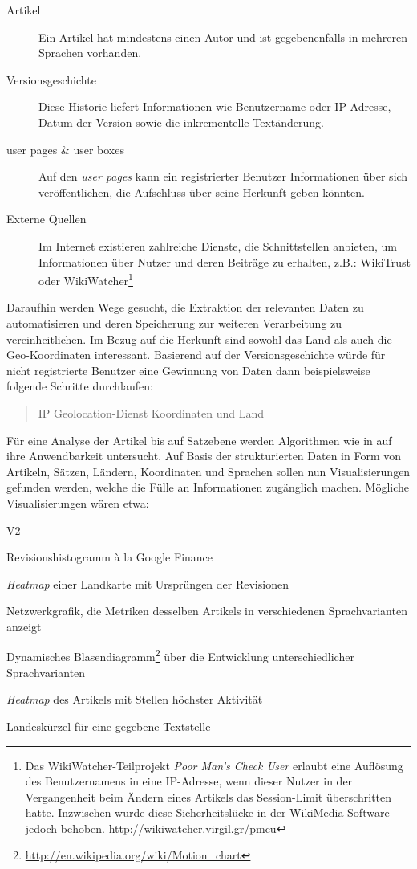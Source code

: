 \begin{description}
\item[Artikel] Ein Artikel hat mindestens einen Autor und ist gegebenenfalls in mehreren Sprachen vorhanden.
\item[Versionsgeschichte] Diese Historie liefert Informationen wie Benutzername oder IP-Adresse, Datum der Version sowie die inkrementelle Textänderung.
\item[user pages \& user boxes] Auf den \emph{user pages} kann ein registrierter Benutzer Informationen über sich veröffentlichen, die Aufschluss über seine Herkunft geben könnten.
\item[Externe Quellen] Im Internet existieren zahlreiche Dienste, die Schnittstellen anbieten, um Informationen über Nutzer und deren Beiträge zu erhalten, z.B.: WikiTrust oder WikiWatcher\footnote{Das WikiWatcher-Teilprojekt \emph{Poor Man's Check User} erlaubt eine Auflösung des Benutzernamens in eine IP-Adresse, wenn dieser Nutzer in der Vergangenheit beim Ändern eines Artikels das Session-Limit überschritten hatte. Inzwischen wurde diese Sicherheitslücke in der WikiMedia-Software jedoch behoben. \url{http://wikiwatcher.virgil.gr/pmcu}}
\end{description}

Daraufhin werden Wege gesucht, die Extraktion der relevanten Daten zu automatisieren und deren Speicherung zur weiteren Verarbeitung zu vereinheitlichen.
Im Bezug auf die Herkunft sind sowohl das Land als auch die Geo-Koordinaten interessant.  
Basierend auf der Versionsgeschichte würde für nicht registrierte Benutzer eine Gewinnung von Daten dann beispielsweise folgende Schritte durchlaufen:

\begin{quotation}
IP \RA Geolocation-Dienst \RA Koordinaten und Land
\end{quotation}

Für eine Analyse der Artikel bis auf Satzebene werden Algorithmen wie in \cite{kramer2008wiki} auf ihre Anwendbarkeit untersucht.
Auf Basis der strukturierten Daten in Form von Artikeln, Sätzen, Ländern, Koordinaten und Sprachen sollen nun Visualisierungen gefunden werden, welche die Fülle an Informationen zugänglich machen.
Mögliche Visualisierungen wären etwa:

\begin{labeling}{V2}
\item[V1] Revisionshistogramm à la Google Finance 
\item[V2] \emph{Heatmap} einer Landkarte mit Ursprüngen der Revisionen 
\item[V3] Netzwerkgrafik, die Metriken desselben Artikels in verschiedenen Sprachvarianten anzeigt
\item[V4] Dynamisches Blasendiagramm\footnote{\url{http://en.wikipedia.org/wiki/Motion_chart}} über die Entwicklung unterschiedlicher Sprachvarianten
\item[V5] \emph{Heatmap} des Artikels mit Stellen höchster Aktivität 
\item[V6] Landeskürzel für eine gegebene Textstelle
\end{labeling}


